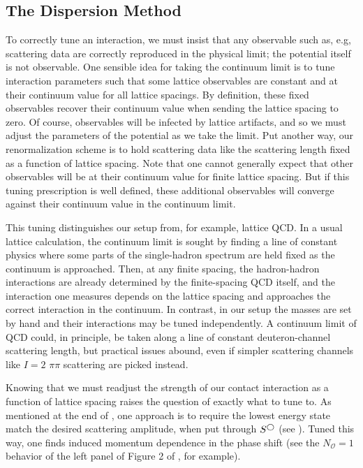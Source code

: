 \subsection{The Dispersion Method}\label{sec:dispersion}

To correctly tune an interaction, we must insist that any observable such as, e.g, scattering data are correctly reproduced in the physical limit; the potential itself is not observable.
One sensible idea for taking the continuum limit is to tune interaction parameters such that some lattice observables are constant and at their continuum value for all lattice spacings.
By definition, these fixed observables recover their continuum value when sending the lattice spacing to zero.
Of course, observables will be infected by lattice artifacts, and so we must adjust the parameters of the potential as we take the limit.
Put another way, our renormalization scheme is to hold scattering data like the scattering length fixed as a function of lattice spacing.
Note that one cannot generally expect that other observables will be at their continuum value for finite lattice spacing.
But if this tuning prescription is well defined, these additional observables will converge against their continuum value in the continuum limit.

This tuning distinguishes our setup from, for example, lattice QCD.
In a usual lattice calculation, the continuum limit is sought by finding a line of constant physics where some parts of the single-hadron spectrum are held fixed as the continuum is approached.
Then, at any finite spacing, the hadron-hadron interactions are already determined by the finite-spacing QCD itself, and the interaction one measures depends on the lattice spacing and approaches the correct interaction in the continuum.
In contrast, in our setup the masses are set by hand and their interactions may be tuned independently.
A continuum limit of QCD could, in principle, be taken along a line of constant deuteron-channel scattering length, but practical issues abound, even if simpler scattering channels like $I=2$ $\pi\pi$ scattering are picked instead.

Knowing that we must readjust the strength of our contact interaction as a function of lattice spacing raises the question of exactly what to tune to.
As mentioned at the end of , one approach is to require the lowest energy state match the desired scattering amplitude, when put through $S^{\bigcirc}$ (see ).
Tuned this way, one finds induced momentum dependence in the phase shift (see the $N_\mathcal{O}=1$ behavior of the left panel of Figure 2 of , for example).

